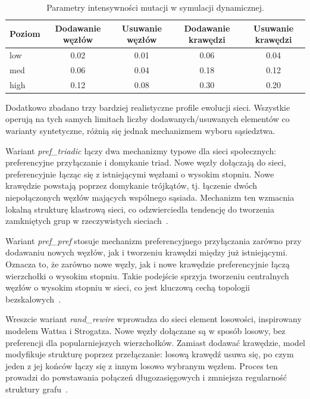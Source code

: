 \begin{table}[H]
    \centering
    \caption{Parametry intensywności mutacji w symulacji dynamicznej.}
    \label{tab:dyn-mutation-levels}
    \begin{tabular}{lcccc}
        \toprule
        \textbf{Poziom} & \textbf{Dodawanie węzłów} & \textbf{Usuwanie węzłów} & \textbf{Dodawanie krawędzi} & \textbf{Usuwanie krawędzi} \\
        \midrule
        low             & 0.02                      & 0.01                     & 0.06                        & 0.04                       \\
        med             & 0.06                      & 0.04                     & 0.18                        & 0.12                       \\
        high            & 0.12                      & 0.08                     & 0.30                        & 0.20                       \\
    \end{tabular}
\end{table}


Dodatkowo zbadano trzy bardziej realistyczne profile ewolucji sieci. Wszystkie operują na tych samych limitach liczby dodawanych/usuwanych elementów co warianty syntetyczne, różnią się jednak mechanizmem wyboru sąsiedztwa.

Wariant \emph{pref\_triadic} łączy dwa mechanizmy typowe dla sieci społecznych: preferencyjne przyłączanie i domykanie triad. Nowe węzły dołączają do sieci, preferencyjnie łącząc się z istniejącymi węzłami o wysokim stopniu. Nowe krawędzie powstają poprzez domykanie trójkątów, tj. łączenie dwóch niepołączonych węzłów mających wspólnego sąsiada. Mechanizm ten wzmacnia lokalną strukturę klastrową sieci, co odzwierciedla tendencję do tworzenia zamkniętych grup w rzeczywistych sieciach~\cite{albert2002statistical,kamola2016dynamika}.

Wariant \emph{pref\_pref} stosuje mechanizm preferencyjnego przyłączania zarówno przy dodawaniu nowych węzłów, jak i tworzeniu krawędzi między już istniejącymi. Oznacza to, że zarówno nowe węzły, jak i nowe krawędzie preferencyjnie łączą wierzchołki o wysokim stopniu. Takie podejście sprzyja tworzeniu centralnych węzłów o wysokim stopniu w sieci, co jest kluczową cechą topologii bezskalowych~\cite{albert2002statistical}.

Wreszcie wariant \emph{rand\_rewire} wprowadza do sieci element losowości, inspirowany modelem Wattsa i Strogatza. Nowe węzły dołączane są w sposób losowy, bez preferencji dla popularniejszych wierzchołków. Zamiast dodawać krawędzie, model modyfikuje strukturę poprzez przełączanie: losową krawędź usuwa się, po czym jeden z jej końców łączy się z innym losowo wybranym węzłem. Proces ten prowadzi do powstawania połączeń długozasięgowych i zmniejsza regularność struktury grafu~\cite{watts1998collective}.



